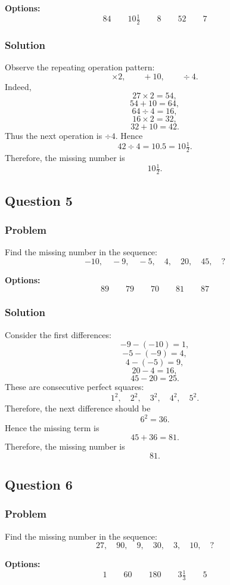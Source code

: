 \documentclass[12pt]{article}
\begin{document}
\noindent\textbf{Options:}
\[
\boxed{84}
\qquad
\boxed{10\tfrac{1}{2}}
\qquad
\boxed{8}
\qquad
\boxed{52}
\qquad
\boxed{7}
\]

\subsubsection{Solution}
Observe the repeating operation pattern:
\[
\times 2,\qquad +10,\qquad \div 4.
\]
Indeed,
\[
27\times 2=54,
\]
\[
54+10=64,
\]
\[
64\div 4=16,
\]
\[
16\times 2=32,
\]
\[
32+10=42.
\]
Thus the next operation is \(\div 4\). Hence
\[
42\div 4=10.5=10\tfrac{1}{2}.
\]
Therefore, the missing number is
\[
\boxed{10\tfrac{1}{2}}.
\]

\subsection{Question 5}
\subsubsection{Problem}
Find the missing number in the sequence:
\[
-10,\quad -9,\quad -5,\quad 4,\quad 20,\quad 45,\quad ?
\]

\noindent\textbf{Options:}
\[
\boxed{89}
\qquad
\boxed{79}
\qquad
\boxed{70}
\qquad
\boxed{81}
\qquad
\boxed{87}
\]

\subsubsection{Solution}
Consider the first differences:
\[
-9-(-10)=1,
\]
\[
-5-(-9)=4,
\]
\[
4-(-5)=9,
\]
\[
20-4=16,
\]
\[
45-20=25.
\]
These are consecutive perfect squares:
\[
1^2,\quad 2^2,\quad 3^2,\quad 4^2,\quad 5^2.
\]
Therefore, the next difference should be
\[
6^2=36.
\]
Hence the missing term is
\[
45+36=81.
\]
Therefore, the missing number is
\[
\boxed{81}.
\]

\subsection{Question 6}
\subsubsection{Problem}
Find the missing number in the sequence:
\[
27,\quad 90,\quad 9,\quad 30,\quad 3,\quad 10,\quad ?
\]

\noindent\textbf{Options:}
\[
\boxed{1}
\qquad
\boxed{60}
\qquad
\boxed{180}
\qquad
\boxed{3\tfrac{1}{3}}
\qquad
\boxed{5}
\]
\end{document}
